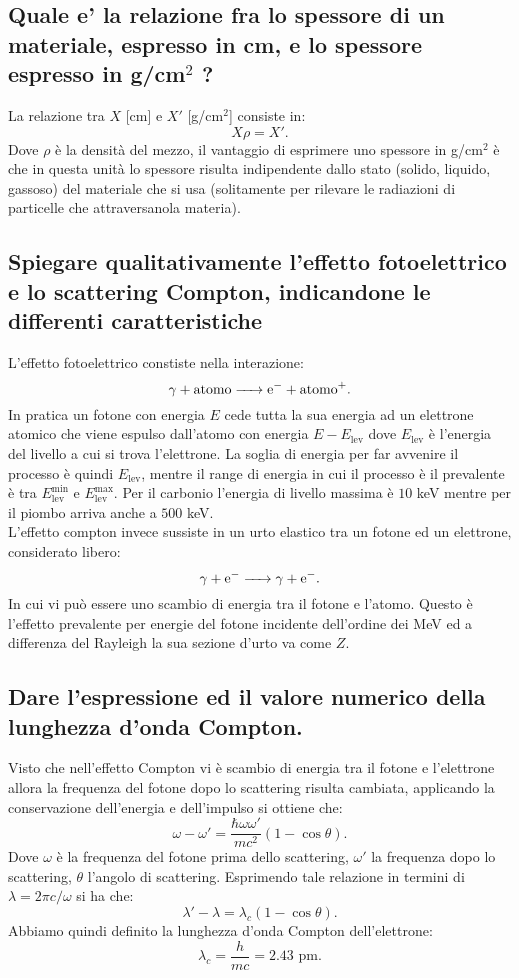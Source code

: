 \subsection[]{Quale e' la relazione fra lo spessore di un materiale, espresso in cm, e lo spessore espresso in g/cm$^2$ ?
} \label{sec:4.a.1}
La relazione tra $X$ [cm] e $X'$ [g/cm$^2$] consiste in:
\[
	X\rho = X'
.\] 
Dove $\rho$ è la densità del mezzo, il vantaggio di esprimere uno spessore in g/cm$^2$ è che in questa unità lo spessore risulta indipendente dallo stato (solido, liquido, gassoso) del materiale che si usa (solitamente per rilevare le radiazioni di particelle che attraversanola materia).
\subsection[]{Spiegare qualitativamente l’effetto fotoelettrico e lo scattering Compton, indicandone le differenti caratteristiche
}\label{sec:4.a.2}
L'effetto fotoelettrico constiste nella interazione:
\[
	\ce{\ce{\gamma} +  \text{atomo} -> \ce{e^-} + \text{atomo}+}
.\] 
In pratica un fotone con energia $E$ cede tutta la sua energia ad un elettrone atomico che viene espulso dall'atomo con energia $E-E_{\text{lev}}$ dove $E_{\text{lev}}$ è l'energia del livello a cui si trova l'elettrone. La soglia di energia per far avvenire il processo è quindi $E_{\text{lev}}$, mentre il range di energia in cui il processo è il prevalente è tra $E^{\text{min}}_{\text{lev}}$ e $E^{\text{max}}_{\text{lev}}$. Per il carbonio l'energia di livello massima è $10$ keV mentre per il piombo arriva anche a $500$ keV.\\
L'effetto compton invece sussiste in un urto elastico tra un fotone ed un elettrone, considerato libero:
\[
	\ce{\ce{\gamma} + e- -> \ce{\gamma} + e- }
.\] 
In cui vi può essere uno scambio di energia tra il fotone e l'atomo. Questo è l'effetto prevalente per energie del fotone incidente dell'ordine dei MeV ed a differenza del Rayleigh la sua sezione d'urto va come $Z$.
\subsection[]{Dare l'espressione ed il valore numerico della lunghezza d'onda Compton.
}\label{sec:4.a.3}
Visto che nell'effetto Compton vi è scambio di energia tra il fotone e l'elettrone allora la frequenza del fotone dopo lo scattering risulta cambiata, applicando la conservazione dell'energia e dell'impulso si ottiene che:
\[
	\omega-\omega'= \frac{\hbar \omega\omega'}{mc^2}\left( 1-\cos\theta \right) 
.\]
Dove $\omega$ è la frequenza del fotone prima dello scattering, $\omega'$ la frequenza dopo lo scattering, $\theta$ l'angolo di scattering.
Esprimendo tale relazione in termini di $\lambda= 2\pi c/ \omega$ si ha che:
\[
	\lambda'-\lambda= \lambda_{c}\left( 1-\cos\theta \right) 
.\] 
Abbiamo quindi definito la lunghezza d'onda Compton dell'elettrone:
\[
	\lambda_{c}=\frac{h}{mc} = 2.43 \text{ pm}
.\] 
